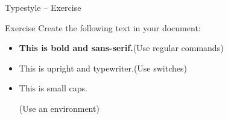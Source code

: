 \documentclass{beamer}
\newcommand{\switch}[1]{\texttt{\textbackslash#1}}
\newcommand{\command}[2]{\texttt{\textbackslash#1\{#2\}}}
\begin{document}
\begin{frame}{Typestyle -- Exercise}
    \begin{block}{Exercise}
        Create the following text in your document:

        \begin{itemize}
            \item \textbf{This is bold and sans-serif.}\hfill(Use regular commands)
            \item {\ttfamily This is upright and typewriter.}\hfill(Use switches)
            \item \begin{rmfamily}\begin{scshape}This is small caps.\end{scshape}\end{rmfamily}\hfill(Use an environment)
        \end{itemize}
    \end{block}
\end{frame}

\end{document}
